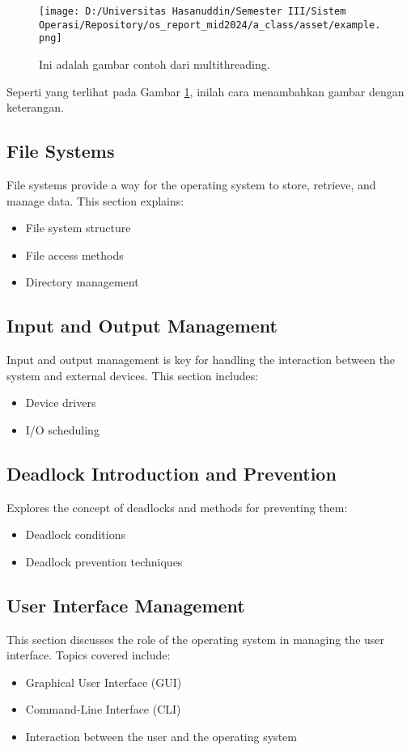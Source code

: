 \documentclass[12pt]{article}
\begin{document}
\begin{figure}[h]
    \centering
    \texttt{[image: D:/Universitas Hasanuddin/Semester III/Sistem Operasi/Repository/os\_report\_mid2024/a\_class/asset/example.png]}  %
    \caption{Ini adalah gambar contoh dari multithreading.}
    \label{fig:contoh_gambar}
\end{figure}

Seperti yang terlihat pada Gambar \ref{fig:contoh_gambar}, inilah cara menambahkan gambar dengan keterangan.

\subsection{File Systems}
File systems provide a way for the operating system to store, retrieve, and manage data. This section explains:
\begin{itemize}
    \item File system structure
    \item File access methods
    \item Directory management
\end{itemize}

\subsection{Input and Output Management}
Input and output management is key for handling the interaction between the system and external devices. This section includes:
\begin{itemize}
    \item Device drivers
    \item I/O scheduling
\end{itemize}

\subsection{Deadlock Introduction and Prevention}
Explores the concept of deadlocks and methods for preventing them:
\begin{itemize}
    \item Deadlock conditions
    \item Deadlock prevention techniques
\end{itemize}

\subsection{User Interface Management}
This section discusses the role of the operating system in managing the user interface. Topics covered include:
\begin{itemize}
    \item Graphical User Interface (GUI)
    \item Command-Line Interface (CLI)
    \item Interaction between the user and the operating system
\end{itemize}
\end{document}
